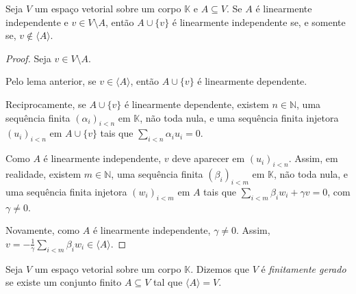 \begin{lemma}
    Seja $V$ um espaço vetorial sobre um corpo $\mathbb K$ e $A \subseteq V$.
    Se $A$ é linearmente independente e $v \in V\setminus A$, então $A \cup \{v\}$ é linearmente independente se, e somente se, $v \notin \langle A \rangle$.
\end{lemma}
\begin{proof}
    Seja $v \in V\setminus A$.
    
    Pelo lema anterior, se $v \in \langle A \rangle$, então $A \cup \{v\}$ é linearmente dependente.

    Reciprocamente, se $A\cup\{v\}$ é linearmente dependente, existem $n \in \mathbb N$, uma sequência finita $(\alpha_i)_{i<n}$ em $\mathbb K$, não toda nula, e uma sequência finita injetora $(u_i)_{i<n}$ em $A \cup \{v\}$ tais que $\sum_{i<n} \alpha_i u_i = 0$.

    Como $A$ é linearmente independente, $v$ deve aparecer em $(u_i)_{i<n}$.
    Assim, em realidade, existem $m \in \mathbb N$, uma sequência finita $(\beta_i)_{i<m}$ em $\mathbb K$, não toda nula, e uma sequência finita injetora $(w_i)_{i<m}$ em $A$ tais que $\sum_{i<m} \beta_i w_i + \gamma v = 0$, com $\gamma \neq 0$.

    Novamente, como $A$ é linearmente independente, $\gamma \neq 0$.
    Assim, $v = -\frac{1}{\gamma} \sum_{i<m} \beta_i w_i \in \langle A \rangle$.
\end{proof}

\begin{definition}
    Seja $V$ um espaço vetorial sobre um corpo $\mathbb K$.
    Dizemos que $V$ é \emph{finitamente gerado} se existe um conjunto finito $A \subseteq V$ tal que $\langle A \rangle = V$.
\end{definition}


